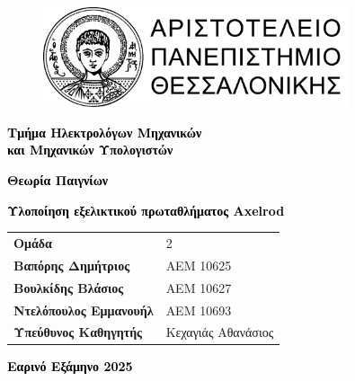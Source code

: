 \documentclass[12pt]{article}
\begin{document}
\begin{titlepage}
\centering
\begin{figure}[H]
\centering
\includegraphics[width=0.8\textwidth]{banner-horizontal-black300ppi.png}\par %
\end{figure}
\vspace{18pt}
\textcolor{black}{\Large \bfseries Τμήμα Ηλεκτρολόγων Μηχανικών\\και Μηχανικών Υπολογιστών\\}\par
\vspace{1cm}
\vfill
\textcolor{black}{\Large \bfseries Θεωρία Παιγνίων}\par
\vspace{12pt}
\textcolor{black}{\large \bfseries Υλοποίηση εξελικτικού πρωταθλήματος Axelrod}\par

\vspace{0.5cm} %
\vfill
{}%
%
{\large
\def\arraystretch{1.3}
\begin{tabularx}{\textwidth}{ R|L }
\textbf{Ομάδα}                			 & 2           \\
\textbf{Βαπόρης Δημήτριος}      & ΑΕΜ 10625 \\
\textbf{Βουλκίδης Βλάσιος}        & ΑΕΜ 10627 \\
\textbf{Ντελόπουλος Εμμανουήλ}      & ΑΕΜ 10693 \\
\textbf{Υπεύθυνος Καθηγητής}           & Κεχαγιάς Αθανάσιος\\
\end{tabularx}
}
\vspace{0.5cm}
\vfill
\textcolor{black}{\large \bfseries Εαρινό Εξάμηνο 2025}\par
\end{titlepage}
\restoregeometry
\end{document}

